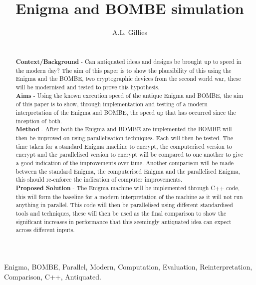 \documentclass[12pt,a4paper]{article}
\title{Enigma and BOMBE simulation}
\author{A.L. Gillies}
\date{}
\begin{document}
\maketitle

\begin{abstract}\\

{\bf Context/Background} - Can antiquated ideas and designs be brought up to speed in the modern day? The aim of this paper is to show the plausibility of this using the Enigma and the BOMBE, two cryptographic devices from the second world war, these will be modernised and tested to prove this hypothesis.\\

{\bf Aims} - Using the known execution speed of the antique Enigma and BOMBE, the aim of this paper is to show, through implementation and testing of a modern interpretation of the Enigma and BOMBE, the speed up that has occurred since the inception of both.\\

{\bf Method} - After both the Enigma and BOMBE are implemented the BOMBE will then be improved on using parallelisation techniques. Each will then be tested. The time taken for a standard Enigma machine to encrypt, the computerised version to encrypt and the parallelised version to encrypt will be compared to one another to give a good indication of the improvements over time. Another comparison will be made between the standard Enigma, the computerised Enigma and the parallelised Enigma, this should re-enforce the indication of computer improvements.\\

{\bf Proposed Solution} - The Enigma machine will be implemented through C++ code, this will form the baseline for a modern interpretation of the machine as it will not run anything in parallel. This code will then be parallelised using different standardised tools and techniques, these will then be used as the final comparison to show the significant increases in performance that this seemingly antiquated idea can expect across different inputs.\\
\end{abstract}

\begin{keywords}
Enigma, BOMBE, Parallel, Modern, Computation, Evaluation, Reinterpretation, Comparison, C++, Antiquated.
\end{keywords}
\end{document}
